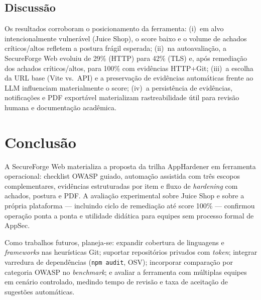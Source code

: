 \documentclass[12pt]{article}
\begin{document}
\subsection{Discussão}
Os resultados corroboram o posicionamento da ferramenta: (i)~em alvo intencionalmente vulnerável (Juice Shop), o score baixo e o volume de achados críticos/altos refletem a postura frágil esperada; (ii)~na autoavaliação, a SecureForge Web evoluiu de 29\% (HTTP) para 42\% (TLS) e, após remediação dos achados críticos/altos, para 100\% com evidências HTTP+Git; (iii)~a escolha da URL base (Vite vs.\ API) e a preservação de evidências automáticas frente ao LLM influenciam materialmente o score; (iv)~a persistência de evidências, notificações e PDF exportável materializam rastreabilidade útil para revisão humana e documentação acadêmica.

\section{Conclusão}
A SecureForge Web materializa a proposta da trilha AppHardener em ferramenta operacional: checklist OWASP guiado, automação assistida com três escopos complementares, evidências estruturadas por item e fluxo de \emph{hardening} com achados, postura e PDF. A avaliação experimental sobre Juice Shop e sobre a própria plataforma --- incluindo ciclo de remediação até score 100\% --- confirmou operação ponta a ponta e utilidade didática para equipes sem processo formal de AppSec.

Como trabalhos futuros, planeja-se: expandir cobertura de linguagens e \emph{frameworks} nas heurísticas Git; suportar repositórios privados com \emph{token}; integrar varredura de dependências (\texttt{npm audit}, OSV); incorporar comparação por categoria OWASP no \emph{benchmark}; e avaliar a ferramenta com múltiplas equipes em cenário controlado, medindo tempo de revisão e taxa de aceitação de sugestões automáticas.



\end{document}
